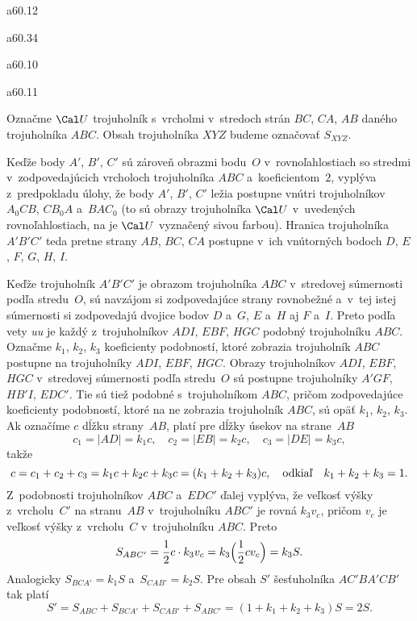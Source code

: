 {%
\epsplace a60.12 \hfil\Obr\par
\epsplace a60.34 \hfil\Obr\par
\epsplace a60.10 \hfil\Obr\par
\epsplace a60.11 \hfil\Obr\par
Označme $\Cal U$ trojuholník s~vrcholmi v~stredoch strán $BC$, $CA$, $AB$
daného trojuholníka $ABC$.
Obsah trojuholníka $XYZ$ budeme označovať $S_{XYZ}$.

Keďže body $A'$, $B'$, $C'$ sú zároveň obrazmi bodu~$O$ v~rovnoľahlostiach
so stredmi v~zodpovedajúcich vrcholoch trojuholníka $ABC$ a~koeficientom~$2$, vyplýva z~predpokladu úlohy,
že body $A'$, $B'$, $C'$ ležia postupne vnútri trojuholníkov $A_0CB$, $CB_0A$ a~$BAC_0$
(to sú obrazy trojuholníka $\Cal U$
v~uvedených rovnoľahlostiach, na \obr{} je $\Cal U$ vyznačený sivou farbou).
Hranica trojuholníka $A'B'C'$ teda pretne strany $AB$, $BC$, $CA$ postupne
v~ich vnútorných bodoch $D$, $E$, $F$, $G$, $H$, $I$.
\inspicture{}

Keďže trojuholník $A'B'C'$ je obrazom trojuholníka $ABC$
v~stredovej súmernosti podľa stredu~$O$, sú
navzájom si zodpovedajúce strany rovnobežné a~v~tej istej súmernosti si zodpovedajú
dvojice bodov $D$ a~$G$, $E$ a~$H$ aj $F$ a~$I$. Preto podľa vety {\it uu\/} je každý
z~trojuholníkov $ADI$, $EBF$, $HGC$ podobný
trojuholníku $ABC$. Označme $k_1$, $k_2$, $k_3$ koeficienty podobností,
ktoré zobrazia trojuholník $ABC$ postupne na trojuholníky $ADI$, $EBF$,
$HGC$. Obrazy trojuholníkov $ADI$, $EBF$, $HGC$ v~stredovej súmernosti podľa
stredu~$O$ sú postupne trojuholníky $A'GF$, $HB'I$, $EDC'$.
Tie sú tiež podobné s~trojuholníkom $ABC$, pričom zodpovedajúce koeficienty
podobností, ktoré na ne zobrazia trojuholník $ABC$,
sú opäť $k_1$, $k_2$, $k_3$. Ak označíme $c$ dĺžku strany~$AB$,
platí pre dĺžky úsekov na strane~$AB$
$$
c_1=|AD|=k_1c,\quad
c_2=|EB|=k_2c,\quad
c_3=|DE|=k_3c,
$$
takže
$$
c=c_1+c_2+c_3=k_1c+k_2c+k_3c=(k_1+k_2+k_3)c,\quad \hbox{odkiaľ} \quad k_1+k_2+k_3=1.
$$
Z~podobnosti trojuholníkov $ABC$ a~$EDC'$ ďalej vyplýva, že veľkosť výšky
z~vrcholu~$C'$ na stranu~$AB$ v~trojuholníku $ABC'$ je rovná $k_3v_c$, pričom
$v_c$ je veľkosť výšky z~vrcholu~$C$ v~trojuholníku $ABC$.
Preto
$$
S_{ABC'}=\frac12 c\cdot k_3v_c=k_3\Bigl(\frac12 cv_c\Bigr)=k_3S.
$$
Analogicky $S_{BCA'}=k_1S$ a~$S_{CAB'}=k_2S$. Pre obsah $S'$ šesťuholníka
$AC'BA'CB'$ tak platí
$$
S'=S_{ABC}+S_{BCA'}+S_{CAB'}+S_{ABC'}=(1+k_1+k_2+k_3)S=2S.
$$

}
